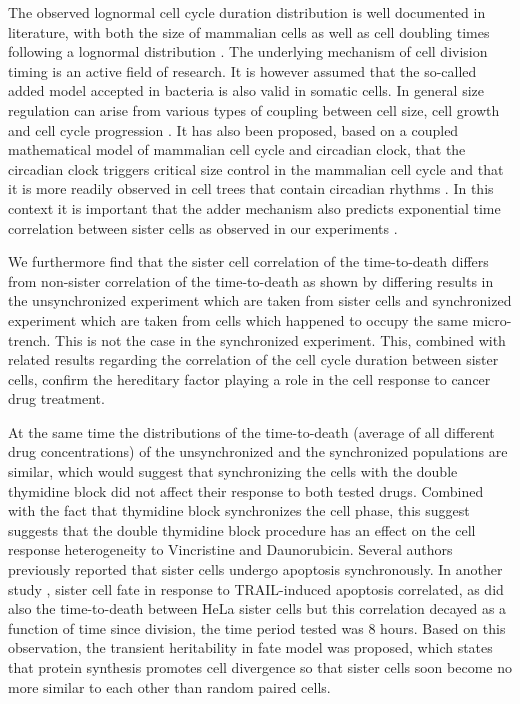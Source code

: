 \documentclass[pdftex,12pt,a4paper]{report}
\begin{document}
The observed lognormal cell cycle duration distribution is well documented in literature, with both the size of mammalian cells as well as cell doubling times following a lognormal distribution \cite{hosoda2011origin, paulus1975platelet}. The underlying mechanism of cell division timing is an active field of research. It is however assumed that the so-called added model accepted in bacteria \cite{campos2014constant} is also valid in somatic cells. In general size regulation can arise from various types of coupling between cell size, cell growth and cell cycle progression \cite{cadart2017size}. It has also been proposed, based on a coupled mathematical model of mammalian cell cycle and circadian clock, that the circadian clock triggers critical size control in the mammalian cell cycle and that it is more readily observed in cell trees that contain circadian rhythms \cite{zamborszky2007computational}. In this context it is important that the adder mechanism also predicts exponential time correlation between sister cells as observed in our experiments \cite{campos2014constant}.

We furthermore find that the sister cell correlation of the time-to-death differs from non-sister correlation of the time-to-death as shown by differing results in the unsynchronized experiment which are taken from sister cells and synchronized experiment which are taken from cells which happened to occupy the same micro-trench. This is not the case in the synchronized experiment. This, combined with related results regarding the correlation of the cell cycle duration between sister cells, confirm the hereditary factor playing a role in the cell response to cancer drug treatment.

At the same time the distributions of the time-to-death (average of all different drug concentrations) of the unsynchronized and the synchronized populations are similar, which would suggest that synchronizing the cells with the double thymidine block did not affect their response to both tested drugs. Combined with the fact that thymidine block synchronizes the cell phase, this suggest suggests that the double thymidine block procedure has an effect on the cell response heterogeneity to Vincristine and Daunorubicin. Several authors \cite{bhola2009determinism, rehm2009dynamics} previously reported that sister cells undergo apoptosis synchronously. In another study \cite{spencer2009non}, sister cell fate in response to TRAIL-induced apoptosis correlated, as did also the time-to-death between HeLa sister cells but this correlation decayed as a function of time since division, the time period tested was 8 hours. Based on this observation, the transient heritability in fate model was proposed, which states that protein synthesis promotes cell divergence so that sister cells soon become no more similar to each other than random paired cells.
\end{document}
